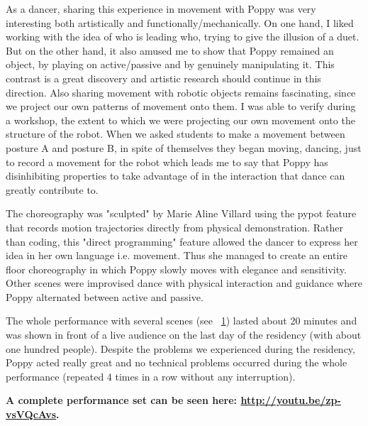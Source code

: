 \begin{formal}
    As a dancer, sharing this experience in movement with Poppy was very interesting both artistically and functionally/mechanically. On one hand, I liked working with the idea of who is leading who, trying to give the illusion of a duet. But on the other hand,  it also amused me to show that Poppy remained an object, by playing on active/passive and by genuinely manipulating it. This contrast is a great discovery and artistic research should continue in this direction.
    Also sharing movement with robotic objects remains fascinating, since we project our own patterns of movement onto them. I was able to verify during a workshop, the  extent to which we were projecting our own movement onto the structure of the robot. When we asked students to make a movement between posture A and posture B, in spite of themselves they began moving, dancing, just to record a movement for the robot which leads me to say that Poppy has disinhibiting properties to take advantage of in the interaction that dance can greatly contribute to.

\end{formal}

The choreography was "sculpted" by Marie Aline Villard using the pypot feature that records motion trajectories directly from physical demonstration. Rather than coding, this "direct programming" feature allowed the dancer to express her idea in her own language i.e. movement. Thus she managed to create an entire floor choreography in which Poppy slowly moves with elegance and sensitivity.
Other scenes were improvised dance with physical interaction and guidance where Poppy alternated between  active and passive.

The whole performance with several scenes (see \figurename~\ref{fig:poppy_dance_performance}) lasted about 20 minutes and was shown in front of a live audience on the last day of the residency (with about one hundred people). Despite the problems we experienced during the residency, Poppy acted really great and no technical problems occurred during the whole performance (repeated 4 times in a row without any interruption).

\textbf{A complete performance set can be seen here: \url{http://youtu.be/zp-vsVQcAvs}.}

\begin{figure}[p]
\centering
    \hfil
    \\
    \hfil
    \\
    \caption{}
    \label{fig:poppy_dance_performance}
\end{figure}


